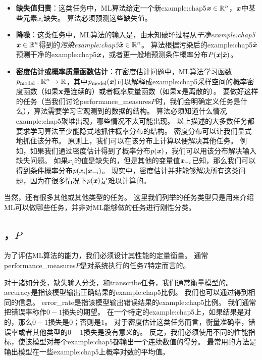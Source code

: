 \begin{itemize}
    \item \textbf{缺失值归责}：这类任务中，\gls{ML}算法给定一个新\gls{example:chap5}$\boldsymbol{\mathit{x}}\in\mathbb{R}^n$，$\boldsymbol{\mathit{x}}$中某些元素$x_i$缺失。
    算法必须预测这些缺失值。


    \item \textbf{降噪}：这类任务中，\gls{ML}算法的输入是，由未知破坏过程从\emph{干净\gls{example:chap5}}$\boldsymbol{\mathit{x}} \in \mathbb{R}^n$得到的\emph{污染\gls{example:chap5}}$\tilde{\boldsymbol{\mathit{x}}} \in \mathbb{R}^n$。
    算法根据污染后的\gls{example:chap5}$\tilde{\boldsymbol{\mathit{x}}}$预测干净的\gls{example:chap5}$\boldsymbol{\mathit{x}}$，或者更一般地预测条件概率分布$P(\boldsymbol{\mathit{x}}|\tilde{\boldsymbol{\mathit{x}}})$。
    
    \item \textbf{密度估计}\textbf{或}\textbf{概率质量函数估计}：在密度估计问题中，\gls{ML}算法学习函数$p_{\text{model}}:\mathbb{R}^n \to \mathbb{R}$，其中$p_{\text{model}}(\boldsymbol{\mathit{x}})$可以解释成\gls{example:chap5}采样空间的概率密度函数（如果$\mathbf{x}$是连续的）或者概率质量函数（如果$\mathbf{x}$是离散的）。
    要做好这样的任务（当我们讨论\gls{performance_measures}$P$时，我们会明确定义任务是什么），算法需要学习它观测到的数据的结构。
    算法必须知道什么情况\gls{example:chap5}聚堆出现，哪些情况不太可能出现。
    以上描述的大多数任务都要求学习算法至少能隐式地抓住概率分布的结构。
    密度分布可以让我们显式地抓住该分布。
    原则上，我们可以在该分布上计算以便解决其他任务。
    例如，如果我们通过密度估计得到了概率分布$p(\boldsymbol{\mathit{x}})$，我们可以用该分布解决输入缺失问题。
    如果$x_i$的值是缺失的，但是其他的变量值$\boldsymbol{\mathit{x}}_{-i}$已知，那么我们可以得到条件概率分布$p(x_i|\boldsymbol{\mathit{x}}_{-i})$。
    现实中，密度估计并非能够解决所有这类问题，因为在很多情况下$p(\boldsymbol{\mathit{x}})$是难以计算的。
\end{itemize}

当然，还有很多其他或其他类型的任务。
这里我们列举的任务类型只是用来介绍\gls{ML}可以做哪些任务，并非对\gls{ML}能够做的任务进行刚性分类。

\subsection{，$P$}
\label{sec:the_performance_measure_p}
为了评估\gls{ML}算法的能力，我们必须设计其性能的定量衡量。
通常\gls{performance_measures}$P$是对系统执行的任务$T$特定而言的。

对于诸如分类，缺失输入分类，和\gls{transcribe}任务，我们通常衡量模型的。
\gls{accuracy}是指该模型输出正确结果的\gls{example:chap5}比例。
我们也可以通过得到相同的信息。
\gls{error_rate}是指该模型输出错误结果的\gls{example:chap5}比例。
我们通常把错误率称作$0-1$损失的期望。
在一个特定的\gls{example:chap5}上，如果结果是对的，那么$0-1$损失是$0$；否则是$1$。
对于密度估计这类任务而言，衡量准确率，错误率或者其他类型的$0-1$损失是没有意义的。
反之，我们必须使用不同的性能指标，使该模型对每个\gls{example:chap5}都输出一个连续数值的得分。
最常用的方法是输出模型在一些\gls{example:chap5}上概率对数的平均值。


